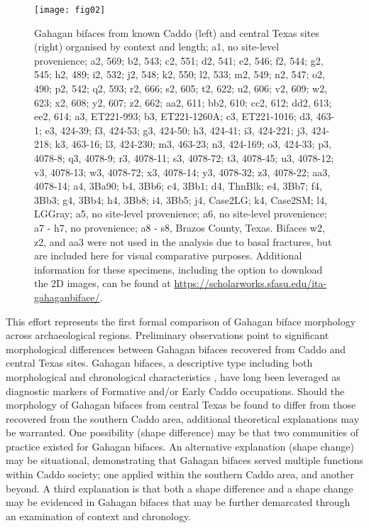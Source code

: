 \documentclass[review]{elsarticle}
\begin{document}
\begin{figure}[htbp]\centering
\texttt{[image: fig02]}
\caption{Gahagan bifaces from known Caddo (left) and central Texas sites (right) organised by context and length; a1, no site-level provenience; a2, 569; b2, 543; c2, 551; d2, 541; e2, 546; f2, 544; g2, 545; h2, 489; i2, 532; j2, 548; k2, 550; l2, 533; m2, 549; n2, 547; o2, 490; p2, 542; q2, 593; r2, 666; s2, 605; t2, 622; u2, 606; v2, 609; w2, 623; x2, 608; y2, 607; z2, 662; aa2, 611; bb2, 610; cc2, 612; dd2, 613; ee2, 614; a3, ET221-993; b3, ET221-1260A; c3, ET221-1016; d3, 463-1; e3, 424-39; f3, 424-53; g3, 424-50; h3, 424-41; i3, 424-221; j3, 424-218; k3, 463-16; l3, 424-230; m3, 463-23; n3, 424-169; o3, 424-33; p3, 4078-8; q3, 4078-9; r3, 4078-11; s3, 4078-72; t3, 4078-45; u3, 4078-12; v3, 4078-13; w3, 4078-72; x3, 4078-14; y3, 4078-32; z3, 4078-22; aa3, 4078-14; a4, 3Ba90; b4, 3Bb6; c4, 3Bb1; d4, ThnBlk; e4, 3Bb7; f4, 3Bb3; g4, 3Bb4; h4, 3Bb8; i4, 3Bb5; j4, Case2LG; k4, Case2SM; l4, LGGray; a5, no site-level provenience; a6, no site-level provenience; a7 - h7, no provenience; a8 - s8, Brazos County, Texas. Bifaces w2, z2, and aa3 were not used in the analysis due to basal fractures, but are included here for visual comparative purposes. Additional information for these specimens, including the option to download the 2D images, can be found at \href{https://scholarworks.sfasu.edu/ita-gahaganbiface/}{https://scholarworks.sfasu.edu/ita-gahaganbiface/}.}
\label{fig:fig2}
\end{figure}

This effort represents the first formal comparison of Gahagan biface morphology across archaeological regions. Preliminary observations point to significant morphological differences between Gahagan bifaces recovered from Caddo and central Texas sites. Gahagan bifaces, a descriptive type including both morphological and chronological characteristics \citep{RN20847,RN4924,RN3684}, have long been leveraged as diagnostic markers of Formative and/or Early Caddo occupations. Should the morphology of Gahagan bifaces from central Texas be found to differ from those recovered from the southern Caddo area, additional theoretical explanations may be warranted. One possibility (shape difference) may be that two communities of practice existed for Gahagan bifaces. An alternative explanation (shape change) may be situational, demonstrating that Gahagan bifaces served multiple functions within Caddo society; one applied within the southern Caddo area, and another beyond. A third explanation is that both a shape difference and a shape change may be evidenced in Gahagan bifaces that may be further demarcated through an examination of context and chronology.
\end{document}
